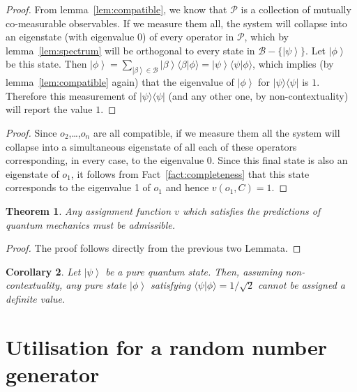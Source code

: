 \documentclass[11pt, a4paper]{article}
\newtheorem{Theorem}{Theorem}
\newtheorem{Corollary}[Theorem]{Corollary}
\theoremstyle{definition}
\newcommand{\ket}[1]{\left| #1 \right>}
\newcommand{\iprod}[2]{\langle #1 | #2 \rangle}
\newcommand{\oprod}[2]{| #1 \rangle\langle #2 |}
\begin{document}
\begin{proof}
From lemma~\ref{lem:compatible}, we know that $\mathcal{P}$ is a collection of mutually co-measurable observables.
If we measure them all, the system will collapse into an eigenstate (with eigenvalue $0$) of every operator in $\mathcal{P}$, which by lemma~\ref{lem:spectrum} will be orthogonal to every state in $\mathcal{B} - \{\ket{\psi}\}$.
Let $\ket{\phi}$ be this state.
Then $\ket{\phi} = \sum_{\ket{\beta} \in \mathcal{B}} \ket{\beta} \iprod{\beta}{\phi} = \ket{\psi} \iprod{\psi}{\phi}$, which implies (by lemma~\ref{lem:compatible} again) that the eigenvalue of $\ket{\phi}$ for $\oprod{\psi}{\psi}$ is $1$.
Therefore this measurement of $\oprod{\psi}{\psi}$ (and any other one, by non-contextuality) will report the value $1$.
\end{proof}
\fi
\begin{proof}
Since $o_2$,\dots,$o_n$ are all compatible, if we measure them all the system will collapse into a simultaneous eigenstate of all each of these operators corresponding, in every case, to the eigenvalue 0. Since this final state is also an eigenstate of $o_1$, it follows from Fact~\ref{fact:completeness} that this state corresponds to the eigenvalue 1 of $o_1$ and hence $v(o_1,C)=1$.
\end{proof}

\begin{Theorem}
	Any assignment function $v$ which satisfies the predictions of quantum mechanics must be admissible.
\end{Theorem}
\begin{proof}
	The proof follows directly from the previous two Lemmata.
\end{proof}

\begin{Corollary}
	\label{col:VIContext}
	Let $\ket{\psi}$ be a pure quantum state. Then, assuming non-contextuality, any pure state $\ket{\phi}$ satisfying $\iprod{\psi}{\phi}=1/\sqrt{2}$ cannot be assigned a definite value.
\end{Corollary}

\section{Utilisation for a random number generator}
\end{document}
